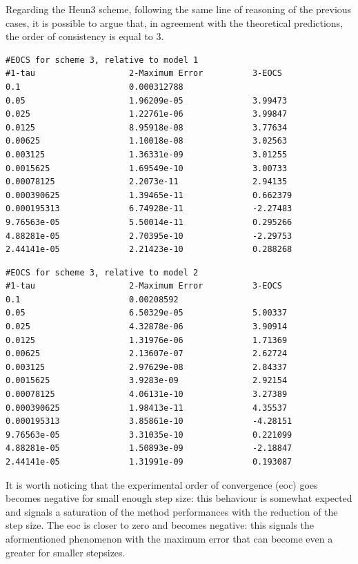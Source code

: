 \documentclass[11pt]{article}
\theoremstyle{theorem}
\theoremstyle{definition}
\begin{document}
Regarding the Heun3 scheme, following the same line of reasoning of the previous cases, it is possible to argue that, in agreement with the theoretical predictions, the order of consistency is equal to 3.\\

\begin{lstlisting}
#EOCS for scheme 3, relative to model 1
#1-tau                   2-Maximum Error          3-EOCS                   
0.1                      0.000312788              	
0.05                     1.96209e-05              3.99473
0.025                    1.22761e-06              3.99847
0.0125                   8.95918e-08              3.77634
0.00625                  1.10018e-08              3.02563
0.003125                 1.36331e-09              3.01255
0.0015625                1.69549e-10              3.00733
0.00078125               2.2073e-11               2.94135
0.000390625              1.39465e-11              0.662379
0.000195313              6.74928e-11              -2.27483
9.76563e-05              5.50014e-11              0.295266
4.88281e-05              2.70395e-10              -2.29753
2.44141e-05              2.21423e-10              0.288268
\end{lstlisting}

\begin{lstlisting}
#EOCS for scheme 3, relative to model 2
#1-tau                   2-Maximum Error          3-EOCS                   
0.1                      0.00208592               	
0.05                     6.50329e-05              5.00337
0.025                    4.32878e-06              3.90914
0.0125                   1.31976e-06              1.71369
0.00625                  2.13607e-07              2.62724
0.003125                 2.97629e-08              2.84337
0.0015625                3.9283e-09               2.92154
0.00078125               4.06131e-10              3.27389
0.000390625              1.98413e-11              4.35537
0.000195313              3.85861e-10              -4.28151
9.76563e-05              3.31035e-10              0.221099
4.88281e-05              1.50893e-09              -2.18847
2.44141e-05              1.31991e-09              0.193087
\end{lstlisting}

It is worth noticing that the experimental order of convergence (eoc) goes becomes negative for small enough step size: this behaviour is somewhat expected and signals a saturation of the method performances with the reduction of the step size. The eoc is closer to zero and becomes negative: this signals the aformentioned phenomenon with the maximum error that can become even a greater for smaller stepsizes.\\
\end{document}
